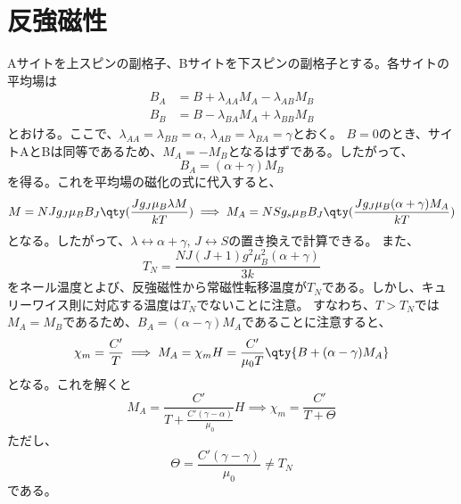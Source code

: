 \section{反強磁性}
Aサイトを上スピンの副格子、Bサイトを下スピンの副格子とする。各サイトの平均場は
\begin{align}
	B_A & = B + \lambda_{AA}M_A - \lambda_{AB}M_B \\
	B_B & = B - \lambda_{BA}M_A + \lambda_{BB}M_B
\end{align}
とおける。ここで、$\lambda_{AA}=\lambda_{BB} = \alpha,\,\lambda_{AB} = \lambda_{BA} = \gamma$とおく。
$B=0$のとき、サイトAとBは同等であるため、$M_A=-M_B$となるはずである。したがって、
\begin{equation}
	B_A=(\alpha+\gamma)M_B
\end{equation}
を得る。これを平均場の磁化の式に代入すると、
\begin{equation}
	M=NJg_J\mu_BB_J\qty(\frac{Jg_J\mu_B\lambda{}M}{kT})\implies M_A = NSg_s\mu_BB_J\qty(\frac{Jg_J\mu_B(\alpha+\gamma)M_A}{kT})
\end{equation}
となる。したがって、$\lambda\leftrightarrow\alpha+\gamma,\,J\leftrightarrow S$の置き換えで計算できる。
また、
\begin{equation}
	T_N = \frac{NJ(J+1)g^2\mu_B^2(\alpha+\gamma)}{3k}
\end{equation}
をネール温度とよび、反強磁性から常磁性転移温度が$T_N$である。しかし、キュリーワイス則に対応する温度は$T_N$でないことに注意。
すなわち、$T>T_N$では$M_A=M_B$であるため、$B_A = (\alpha-\gamma)M_A$であることに注意すると、
\begin{equation}
	\chi_m = \frac{C'}{T}\implies M_A = \chi_mH = \frac{C'}{\mu_0T}\qty{B+(\alpha-\gamma)M_A}
\end{equation}
となる。これを解くと
\begin{equation}
	M_A = \frac{C'}{T+\frac{C'(\gamma-\alpha)}{\mu_0}}H \implies \chi_m = \frac{C'}{T+\Theta}
\end{equation}
ただし、
\begin{equation}
	\Theta = \frac{C'(\gamma-\gamma)}{\mu_0}\neq T_N
\end{equation}
である。
